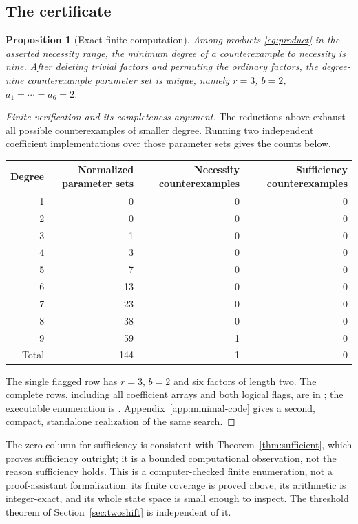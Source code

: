 \documentclass[11pt]{article}
\theoremstyle{research}
\newtheorem{proposition}[theorem]{Proposition}
\theoremstyle{definition}
\numberwithin{equation}{section}
\begin{document}
\subsection{The certificate}
\begin{proposition}[Exact finite computation]\label{prop:minimum}
Among products \eqref{eq:product} in the asserted necessity range, the
minimum degree of a counterexample to necessity is nine. After deleting
trivial factors and permuting the ordinary factors, the degree-nine
counterexample parameter set is unique, namely $r=3$, $b=2$,
$a_1=\cdots=a_6=2$.
\end{proposition}
\begin{proof}[Finite verification and its completeness argument]
The reductions above exhaust all possible counterexamples of smaller
degree. Running two independent coefficient implementations over those
parameter sets gives the counts below.
\begin{center}
\small
\begin{tabular}{rrrr}
\toprule
Degree & Normalized parameter sets & Necessity counterexamples
 & Sufficiency counterexamples\\
\midrule
1&0&0&0\\
2&0&0&0\\
3&1&0&0\\
4&3&0&0\\
5&7&0&0\\
6&13&0&0\\
7&23&0&0\\
8&38&0&0\\
9&59&1&0\\
\midrule
Total&144&1&0\\
\bottomrule
\end{tabular}
\end{center}
The single flagged row has $r=3$, $b=2$ and six factors of length two.
The complete rows, including all coefficient arrays and both logical flags,
are in ; the executable enumeration is
. Appendix~\ref{app:minimal-code} gives a
second, compact, standalone realization of the same search.
\end{proof}

The zero column for sufficiency is consistent with
Theorem~\ref{thm:sufficient}, which proves sufficiency outright; it is a
bounded computational observation, not the reason sufficiency holds.
This is a computer-checked finite enumeration, not a proof-assistant
formalization: its finite coverage is proved above, its arithmetic is
integer-exact, and its whole state space is small enough to inspect.
The threshold theorem of Section~\ref{sec:twoshift} is independent of it.
\end{document}
